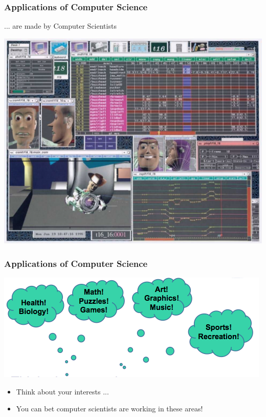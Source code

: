 \documentclass{beamer}
\begin{document}
\begin{frame}
  \frametitle{Applications of Computer Science}
  ... are made by Computer Scientists
  \begin{center}
  \includegraphics[scale=0.3]{images/ani2}
  \end{center}
\end{frame}
\begin{frame}
  \frametitle{Applications of Computer Science}
  \begin{center}
  \includegraphics[scale=0.5]{images/interests}
  \end{center}
  \begin{itemize}
  	\item Think about your interests ...
	\item You can bet computer scientists are working in these areas!
  \end{itemize}
\end{frame}
\end{document}
